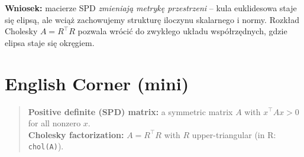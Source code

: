\documentclass[12pt]{article}
\begin{document}
\noindent
\textbf{Wniosek:} macierze SPD \emph{zmieniają metrykę przestrzeni} – kula euklidesowa staje się elipsą,
ale wciąż zachowujemy strukturę iloczynu skalarnego i normy.
Rozkład Cholesky $A=R^\top R$ pozwala wrócić do zwykłego układu współrzędnych,
gdzie elipsa staje się okręgiem.


\section*{English Corner (mini)}
\begin{quote}
\textbf{Positive definite (SPD) matrix:} a symmetric matrix $A$ with $x^\top A x > 0$ for all nonzero $x$.\\
\textbf{Cholesky factorization:} $A = R^\top R$ with $R$ upper-triangular (in R: \texttt{chol(A)}).
\end{quote}
\end{document}
